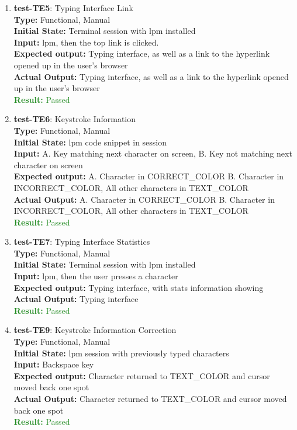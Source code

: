 \documentclass[12pt, titlepage]{article}
\begin{document}
\begin{enumerate}
\item{\textbf{test-TE5}: Typing Interface Link\\}
\textbf{Type:} Functional, Manual \\
\textbf{Initial State:} Terminal session with lpm installed \\
\textbf{Input:} lpm, then the top link is clicked. \\
\textbf{Expected output: } Typing interface, as well as a link to the hyperlink opened up in the user's browser \\
\textbf{Actual Output:} Typing interface, as well as a link to the hyperlink opened up in the user's browser \\
\textcolor{ForestGreen}{\textbf{Result:} Passed}

\item{\textbf{test-TE6}: Keystroke Information\\}
\textbf{Type:} Functional, Manual \\
\textbf{Initial State:} lpm code snippet in session  \\
\textbf{Input:} A. Key matching next character on screen, B. Key not matching next character on screen\\
\textbf{Expected output: } A. Character in CORRECT\_COLOR B. Character in INCORRECT\_COLOR, All other characters in TEXT\_COLOR  \\
\textbf{Actual Output:} A. Character in CORRECT\_COLOR B. Character in INCORRECT\_COLOR, All other characters in TEXT\_COLOR  \\
\textcolor{ForestGreen}{\textbf{Result:} Passed}

\item{\textbf{test-TE7}: Typing Interface Statistics\\}
\textbf{Type:} Functional, Manual \\
\textbf{Initial State:} Terminal session with lpm installed \\
\textbf{Input:} lpm, then the user presses a character \\
\textbf{Expected output: }Typing interface, with stats information showing \\
\textbf{Actual Output:}  Typing interface \\
\textcolor{ForestGreen}{\textbf{Result:} Passed}

\item{\textbf{test-TE9}: Keystroke Information Correction\\}
\textbf{Type:} Functional, Manual \\
\textbf{Initial State:} lpm session with previously typed characters \\
\textbf{Input:} Backspace key\\
\textbf{Expected output: } Character returned to TEXT\_COLOR and cursor moved back one spot \\
\textbf{Actual Output:} Character returned to TEXT\_COLOR and cursor moved back one spot \\
\textcolor{ForestGreen}{\textbf{Result:} Passed}
\end{enumerate}
\end{document}
